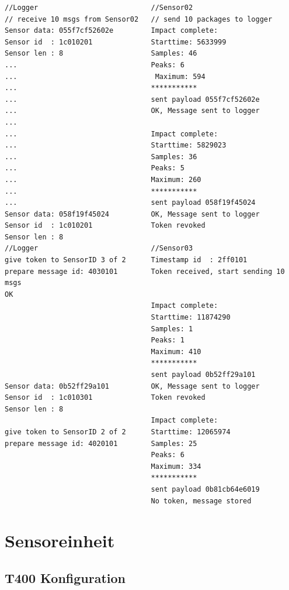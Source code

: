 \begin{lstlisting}[caption=T190 Tokenvergabe, label=t190]
//Logger                           //Sensor02
// receive 10 msgs from Sensor02   // send 10 packages to logger
Sensor data: 055f7cf52602e         Impact complete:
Sensor id  : 1c010201              Starttime: 5633999
Sensor len : 8                     Samples: 46
...                                Peaks: 6
...                                 Maximum: 594
...                                ***********
...                                sent payload 055f7cf52602e
...                                OK, Message sent to logger
...                                
...                                Impact complete:
...                                Starttime: 5829023
...                                Samples: 36
...                                Peaks: 5
...                                Maximum: 260
...                                ***********
...                                sent payload 058f19f45024
Sensor data: 058f19f45024          OK, Message sent to logger
Sensor id  : 1c010201              Token revoked
Sensor len : 8                     
//Logger                           //Sensor03
give token to SensorID 3 of 2      Timestamp id  : 2ff0101
prepare message id: 4030101        Token received, start sending 10 msgs
OK
                                   Impact complete:
                                   Starttime: 11874290
                                   Samples: 1
                                   Peaks: 1
                                   Maximum: 410
                                   ***********
                                   sent payload 0b52ff29a101
Sensor data: 0b52ff29a101          OK, Message sent to logger
Sensor id  : 1c010301              Token revoked
Sensor len : 8                     
                                   Impact complete:
give token to SensorID 2 of 2      Starttime: 12065974
prepare message id: 4020101        Samples: 25
                                   Peaks: 6
                                   Maximum: 334
                                   ***********
                                   sent payload 0b81cb64e6019
                                   No token, message stored
\end{lstlisting}


\section{Sensoreinheit}
\subsection{T400 Konfiguration}
